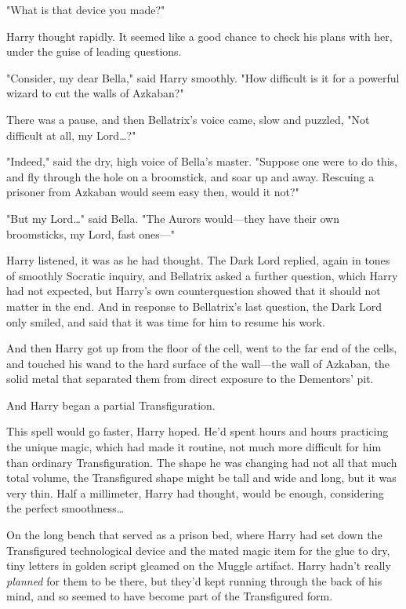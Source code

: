 "What is that device you made?"

Harry thought rapidly. It seemed like a good chance to check his plans with 
her, under the guise of leading questions.

"Consider, my dear Bella," said Harry smoothly. "How difficult is it for a 
powerful wizard to cut the walls of Azkaban?"

There was a pause, and then Bellatrix's voice came, slow and puzzled, "Not 
difficult at all, my Lord{\ldots}?"

"Indeed," said the dry, high voice of Bella's master. "Suppose one were to do 
this, and fly through the hole on a broomstick, and soar up and away. Rescuing 
a prisoner from Azkaban would seem easy then, would it not?"

"But my Lord{\ldots}" said Bella. "The Aurors would---they have their own 
broomsticks, my Lord, fast ones---"

Harry listened, it was as he had thought. The Dark Lord replied, again in tones 
of smoothly Socratic inquiry, and Bellatrix asked a further question, which 
Harry had not expected, but Harry's own counterquestion showed that it should 
not matter in the end. And in response to Bellatrix's last question, the Dark 
Lord only smiled, and said that it was time for him to resume his work.

And then Harry got up from the floor of the cell, went to the far end of the 
cells, and touched his wand to the hard surface of the wall---the wall of 
Azkaban, the solid metal that separated them from direct exposure to the 
Dementors' pit.

And Harry began a partial Transfiguration.

This spell would go faster, Harry hoped. He'd spent hours and hours practicing 
the unique magic, which had made it routine, not much more difficult for him 
than ordinary Transfiguration. The shape he was changing had not all that much 
total volume, the Transfigured shape might be tall and wide and long, but it 
was very thin. Half a millimeter, Harry had thought, would be enough, 
considering the perfect smoothness{\ldots}

On the long bench that served as a prison bed, where Harry had set down the 
Transfigured technological device and the mated magic item for the glue to dry, 
tiny letters in golden script gleamed on the Muggle artifact. Harry hadn't 
really \emph{planned} for them to be there, but they'd kept running through the 
back of his mind, and so seemed to have become part of the Transfigured form.

